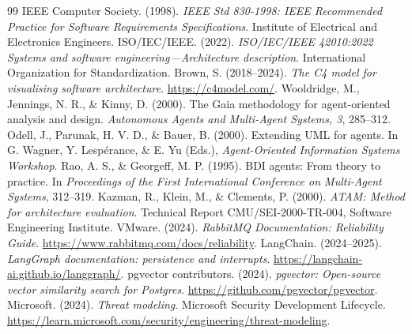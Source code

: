 \documentclass[11pt,a4paper]{article}
\begin{document}
\begin{thebibliography}{99}
 IEEE Computer Society. (1998). \textit{IEEE Std 830-1998: IEEE Recommended Practice for Software Requirements Specifications}. Institute of Electrical and Electronics Engineers.
 ISO/IEC/IEEE. (2022). \textit{ISO/IEC/IEEE 42010:2022 Systems and software engineering---Architecture description}. International Organization for Standardization.
 Brown, S. (2018--2024). \textit{The C4 model for visualising software architecture}. \url{https://c4model.com/}.
 Wooldridge, M., Jennings, N. R., \& Kinny, D. (2000). The Gaia methodology for agent-oriented analysis and design. \textit{Autonomous Agents and Multi-Agent Systems, 3}, 285--312.
 Odell, J., Parunak, H. V. D., \& Bauer, B. (2000). Extending UML for agents. In G. Wagner, Y. Lespérance, \& E. Yu (Eds.), \textit{Agent-Oriented Information Systems Workshop}.
 Rao, A. S., \& Georgeff, M. P. (1995). BDI agents: From theory to practice. In \textit{Proceedings of the First International Conference on Multi-Agent Systems}, 312--319.
 Kazman, R., Klein, M., \& Clements, P. (2000). \textit{ATAM: Method for architecture evaluation}. Technical Report CMU/SEI-2000-TR-004, Software Engineering Institute.
 VMware. (2024). \textit{RabbitMQ Documentation: Reliability Guide}. \url{https://www.rabbitmq.com/docs/reliability}.
 LangChain. (2024--2025). \textit{LangGraph documentation: persistence and interrupts}. \url{https://langchain-ai.github.io/langgraph/}.
 pgvector contributors. (2024). \textit{pgvector: Open-source vector similarity search for Postgres}. \url{https://github.com/pgvector/pgvector}.
 Microsoft. (2024). \textit{Threat modeling}. Microsoft Security Development Lifecycle. \url{https://learn.microsoft.com/security/engineering/threat-modeling}.
\end{thebibliography}
\end{document}
